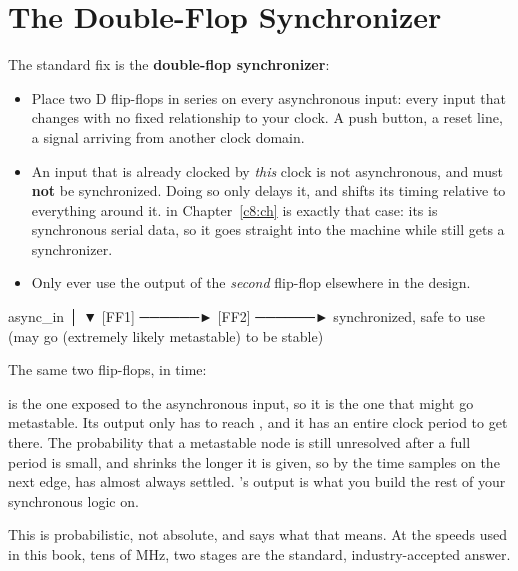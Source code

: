 \section{The Double-Flop Synchronizer}
\label{c4:a3}
The standard fix is the \textbf{double-flop synchronizer}:
\begin{itemize}
  \item Place two D flip-flops in series on every asynchronous input: every input that changes with
    no fixed relationship to your clock. A push button, a reset line, a signal arriving from
    another clock domain.
  \item An input that is already clocked by \emph{this} clock is not asynchronous, and must
    \textbf{not} be synchronized. Doing so only delays it, and shifts its timing relative to
    everything around it.  in Chapter~\ref{c8:ch} is exactly that case: its
     is synchronous serial data, so it goes straight into the machine while
     still gets a synchronizer.
  \item Only ever use the output of the \emph{second} flip-flop elsewhere in the design.
\end{itemize}

\begin{textdrawing}
async_in
   │
   ▼
 [FF1] ──────► [FF2] ──────► synchronized, safe to use
   (may go        (extremely likely
   metastable)     to be stable)
\end{textdrawing}

\noindent The same two flip-flops, in time:


\noindent{} is the one exposed to the asynchronous input, so it is the one that might go
metastable. Its output only has to reach , and it has an entire clock period to get there.
The probability that a metastable node is still unresolved after a full period is small, and
shrinks the longer it is given, so by the time  samples on the next edge,  has
almost always settled. 's output is what you build the rest of your synchronous logic on.

This is probabilistic, not absolute, and  says what that means. At the speeds used in
this book, tens of MHz, two stages are the standard, industry-accepted answer.

